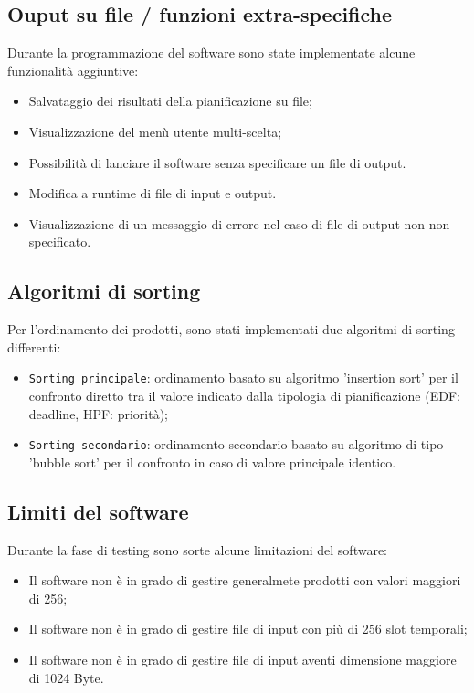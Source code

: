 \documentclass[a4paper]{report}
\begin{document}
  \subsection{Ouput su file / funzioni extra-specifiche}
  Durante la programmazione del software sono state implementate alcune funzionalità aggiuntive:
    \begin{itemize}
      \item Salvataggio dei risultati della pianificazione su file;
      \item Visualizzazione del menù utente multi-scelta;
      \item Possibilità di lanciare il software senza specificare un file di output.
      \item Modifica a runtime di file di input e output.
      \item Visualizzazione di un messaggio di errore nel caso di file di output non non specificato.
    \end{itemize}

  \subsection{Algoritmi di sorting}
  Per l'ordinamento dei prodotti, sono stati implementati due algoritmi di sorting differenti:

    \begin{itemize}
      \item \texttt{Sorting principale}: ordinamento basato su algoritmo 'insertion sort' per il confronto diretto tra il valore indicato dalla tipologia di pianificazione (EDF: deadline, HPF: priorità);
      \item \texttt{Sorting secondario}: ordinamento secondario basato su algoritmo di tipo 'bubble sort' per il confronto in caso di valore principale identico.
    \end{itemize}
    
    \subsection{Limiti del software}
    Durante la fase di testing sono sorte alcune limitazioni del software:

      \begin{itemize}
        \item Il software non è in grado di gestire generalmete prodotti con valori maggiori di 256;
        \item Il software non è in grado di gestire file di input con più di 256 slot temporali;
        \item Il software non è in grado di gestire file di input aventi dimensione maggiore di 1024 Byte.
      \end{itemize}
\end{document}

